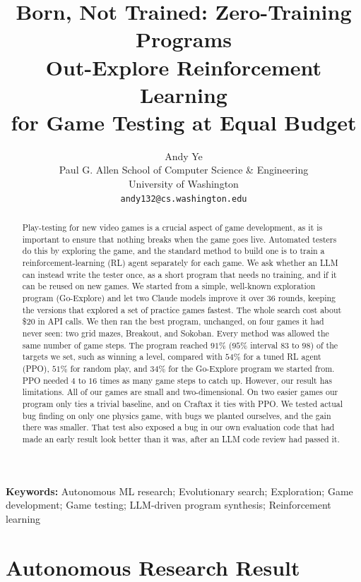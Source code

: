 \documentclass{article}
\title{Born, Not Trained: Zero-Training Programs\\Out-Explore Reinforcement Learning\\for Game Testing at Equal Budget}
\author{%
  Andy Ye \\
  Paul G. Allen School of Computer Science \& Engineering \\
  University of Washington \\
  \texttt{andy132@cs.washington.edu} \\
}
\begin{document}
\maketitle

\begin{abstract}
Play-testing for new video games is a crucial aspect of game development, as it is important to ensure that nothing breaks when the game goes live. Automated testers do this by exploring the game, and the standard method to build one is to train a reinforcement-learning (RL) agent separately for each game. We ask whether an LLM can instead write the tester once, as a short program that needs no training, and if it can be reused on new games. We started from a simple, well-known exploration program (Go-Explore) and let two Claude models improve it over $36$ rounds, keeping the versions that explored a set of practice games fastest. The whole search cost about \$20 in API calls. We then ran the best program, unchanged, on four games it had never seen: two grid mazes, Breakout, and Sokoban. Every method was allowed the same number of game steps. The program reached $91\%$ ($95\%$ interval $83$ to $98$) of the targets we set, such as winning a level, compared with $54\%$ for a tuned RL agent (PPO), $51\%$ for random play, and $34\%$ for the Go-Explore program we started from. PPO needed $4$ to $16$ times as many game steps to catch up. However, our result has limitations. All of our games are small and two-dimensional. On two easier games our program only ties a trivial baseline, and on Craftax it ties with PPO. We tested actual bug finding on only one physics game, with bugs we planted ourselves, and the gain there was smaller. That test also exposed a bug in our own evaluation code that had made an early result look better than it was, after an LLM code review had passed it.
\end{abstract}

\noindent\textbf{Keywords:} Autonomous ML research; Evolutionary search; Exploration; Game development; Game testing; LLM-driven program synthesis; Reinforcement learning

\section{Autonomous Research Result}
\end{document}
